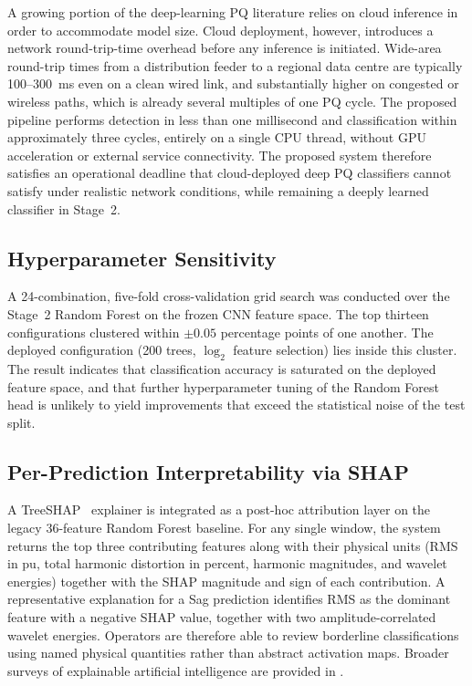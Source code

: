 \documentclass[conference]{IEEEtran}
\begin{document}
A growing portion of the deep-learning PQ literature relies on cloud
inference in order to accommodate model size. Cloud deployment,
however, introduces a network round-trip-time overhead
before any inference is initiated. Wide-area round-trip times from a
distribution feeder to a regional data centre are typically 100--300~ms
even on a clean wired link, and substantially higher on congested or
wireless paths, which is already several multiples of one PQ cycle. The
proposed pipeline performs detection in less than one millisecond and
classification within approximately three cycles, entirely on a single
CPU thread, without GPU acceleration or external service connectivity.
The proposed system therefore satisfies an operational deadline that
cloud-deployed deep PQ classifiers cannot satisfy under realistic
network conditions, while remaining a deeply learned classifier in
Stage~2.

\subsection{Hyperparameter Sensitivity}\label{sec:tuning}
A 24-combination, five-fold cross-validation grid search was conducted
over the Stage~2 Random Forest on the frozen CNN feature space. The
top thirteen configurations clustered within $\pm 0.05$ percentage
points of one another. The deployed configuration (200 trees,
$\log_2$ feature selection) lies inside this cluster. The result
indicates that classification accuracy is saturated on the deployed
feature space, and that further hyperparameter tuning of the Random
Forest head is unlikely to yield improvements that exceed the
statistical noise of the test split.

\subsection{Per-Prediction Interpretability via SHAP}
A TreeSHAP~\cite{lundberg2020trees} explainer is integrated as a
post-hoc attribution layer on the legacy 36-feature Random Forest
baseline. For any single window, the system returns the top three
contributing features along with their physical units (RMS in pu,
total harmonic distortion in percent, harmonic magnitudes, and
wavelet energies) together with the SHAP magnitude and sign of each
contribution. A representative explanation for a Sag prediction
identifies RMS as the dominant feature with a negative SHAP value,
together with two amplitude-correlated wavelet energies. Operators
are therefore able to review borderline classifications using named
physical quantities rather than abstract activation maps. Broader
surveys of explainable artificial intelligence are provided in
\cite{linardatos2021xai}.
\end{document}
